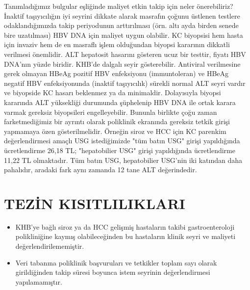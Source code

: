 Tanımladığımız bulgular eşliğinde maliyet etkin takip için neler önerebiliriz? İnaktif taşıyıcılığın iyi seyrini dikkate alarak masrafın çoğunu üstlenen testlere odaklandığımızda takip periyodunun arttırılması (örn. altı ayda birden senede bire uzatılması) HBV DNA için maliyet uygun olabilir.  KC biyopsisi hem hasta için invaziv hem de en masraflı işlem olduğundan biyopsi kararının dikkatli verilmesi önemlidir. ALT hepatosit hasarını gösteren ucuz bir testtir, fiyatı HBV DNA'nın yüzde biridir. KHB'de dalgalı seyir gösterebilir. Antiviral verilmesine gerek olmayan HBeAg pozitif HBV enfeksiyonu (immuntoleran) ve HBeAg negatif HBV enfeksiyonunda (inaktif taşıyıcılık) sürekli normal ALT seyri vardır ve biyopside KC hasarı beklenmez ya da minimaldir. Dolayısıyla biyopsi kararında ALT yüksekliği durumunda şüphelenip HBV DNA ile ortak karara varmak gereksiz biyopsileri engelleyebilir. Bununla birlikte çoğu zaman farketmediğimiz bir ayrıntı olarak poliklinik ekranında gereksiz tetkik girişi yapmamaya özen gösterilmelidir. Örneğin siroz ve HCC için KC parenkim değerlendirmesi amaçlı USG istediğimizde "tüm batın USG" girişi yapıldığında ücretlendirme 26,18 TL; "hepatobilier USG" girişi yapıldığında ücretlendirme 11,22 TL olmaktadır. Tüm batın USG, hepatobilier USG'nin iki katından daha pahalıdır, aradaki fark aynı zamanda 12 tane ALT değerindedir.   






\newpage

\section{TEZİN KISITLILIKLARI}


\begin{itemize}
\item KHB'ye bağlı siroz ya da HCC gelişmiş hastaların takibi gastroenteroloji polikliniğine kaymış olabileceğinden bu hastaların klinik seyri ve maliyeti değerlendirilememiştir.

\item Veri tabanına poliklinik başvuruları ve tetkikler toplam sayı olarak girildiğinden takip süresi boyunca istem seyrinin değerlendirmesi yapılamamıştır. 


\end{itemize}

  


